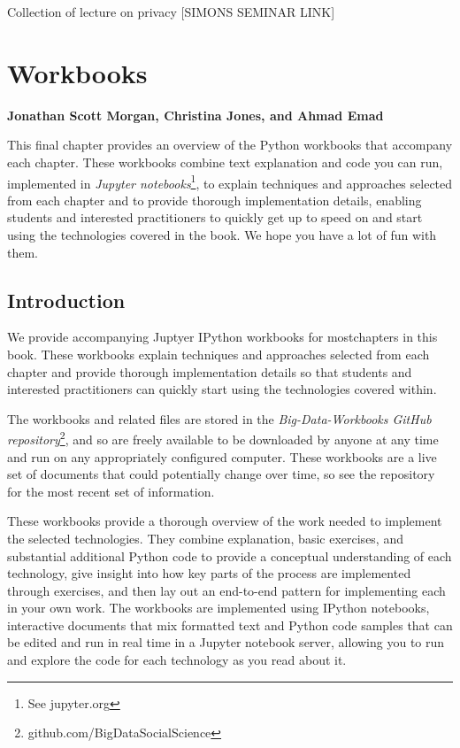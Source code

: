 \documentclass[]{krantz}
\begin{document}
Collection of lecture on privacy {[}SIMONS SEMINAR LINK{]}

\hypertarget{chap:workbooks}{\chapter{Workbooks}\label{chap:workbooks}}

\textbf{Jonathan Scott Morgan, Christina Jones, and Ahmad Emad}

This final chapter provides an overview of the Python workbooks that
accompany each chapter. These workbooks combine text explanation and
code you can run, implemented in \emph{Jupyter notebooks}\footnote{See
  jupyter.org}, to explain techniques and approaches selected from each
chapter and to provide thorough implementation details, enabling
students and interested practitioners to quickly get up to speed on and
start using the technologies covered in the book. We hope you have a lot
of fun with them.

\section{Introduction}\label{introduction-5}

We provide accompanying Juptyer IPython workbooks for mostchapters in
this book. These workbooks explain techniques and approaches selected
from each chapter and provide thorough implementation details so that
students and interested practitioners can quickly start using the
technologies covered within.

The workbooks and related files are stored in the
\emph{Big-Data-Workbooks GitHub repository}\footnote{github.com/BigDataSocialScience},
and so are freely available to be downloaded by anyone at any time and
run on any appropriately configured computer. These workbooks are a live
set of documents that could potentially change over time, so see the
repository for the most recent set of information.

These workbooks provide a thorough overview of the work needed to
implement the selected technologies. They combine explanation, basic
exercises, and substantial additional Python code to provide a
conceptual understanding of each technology, give insight into how key
parts of the process are implemented through exercises, and then lay out
an end-to-end pattern for implementing each in your own work. The
workbooks are implemented using IPython notebooks, interactive documents
that mix formatted text and Python code samples that can be edited and
run in real time in a Jupyter notebook server, allowing you to run and
explore the code for each technology as you read about it.
\end{document}
